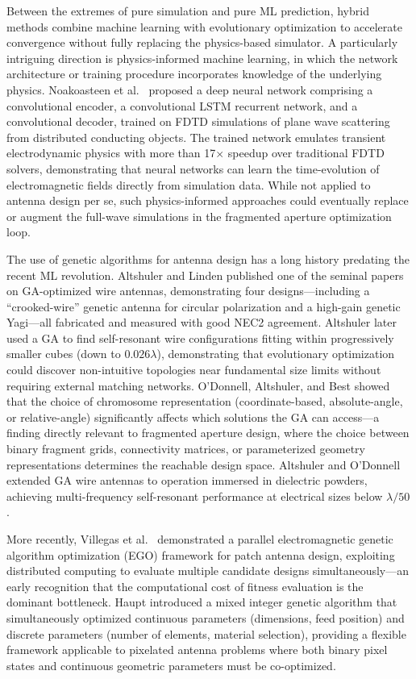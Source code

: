 Between the extremes of pure simulation and pure ML prediction, hybrid methods combine machine learning with evolutionary optimization to accelerate convergence without fully replacing the physics-based simulator.  A particularly intriguing direction is physics-informed machine learning, in which the network architecture or training procedure incorporates knowledge of the underlying physics.  Noakoasteen et al.\ \cite{Noakoasteen2020PhysicsInformed} proposed a deep neural network comprising a convolutional encoder, a convolutional LSTM recurrent network, and a convolutional decoder, trained on FDTD simulations of plane wave scattering from distributed conducting objects.  The trained network emulates transient electrodynamic physics with more than 17$\times$ speedup over traditional FDTD solvers, demonstrating that neural networks can learn the time-evolution of electromagnetic fields directly from simulation data.  While not applied to antenna design per se, such physics-informed approaches could eventually replace or augment the full-wave simulations in the fragmented aperture optimization loop.

The use of genetic algorithms for antenna design has a long history predating the recent ML revolution.  Altshuler and Linden \cite{Altshuler1997GAWire} published one of the seminal papers on GA-optimized wire antennas, demonstrating four designs---including a ``crooked-wire'' genetic antenna for circular polarization and a high-gain genetic Yagi---all fabricated and measured with good NEC2 agreement.  Altshuler \cite{Altshuler2002SmallGA} later used a GA to find self-resonant wire configurations fitting within progressively smaller cubes (down to $0.026\lambda$), demonstrating that evolutionary optimization could discover non-intuitive topologies near fundamental size limits without requiring external matching networks.  O'Donnell, Altshuler, and Best \cite{ODonnell2003Representation} showed that the choice of chromosome representation (coordinate-based, absolute-angle, or relative-angle) significantly affects which solutions the GA can access---a finding directly relevant to fragmented aperture design, where the choice between binary fragment grids, connectivity matrices, or parameterized geometry representations determines the reachable design space.  Altshuler and O'Donnell \cite{Altshuler2011MultiFreqDielectric} extended GA wire antennas to operation immersed in dielectric powders, achieving multi-frequency self-resonant performance at electrical sizes below $\lambda/50$.

More recently, Villegas et al.\ \cite{Villegas2004ParallelEGO} demonstrated a parallel electromagnetic genetic algorithm optimization (EGO) framework for patch antenna design, exploiting distributed computing to evaluate multiple candidate designs simultaneously---an early recognition that the computational cost of fitness evaluation is the dominant bottleneck.  Haupt \cite{Haupt2007MixedIntegerGA} introduced a mixed integer genetic algorithm that simultaneously optimized continuous parameters (dimensions, feed position) and discrete parameters (number of elements, material selection), providing a flexible framework applicable to pixelated antenna problems where both binary pixel states and continuous geometric parameters must be co-optimized.

